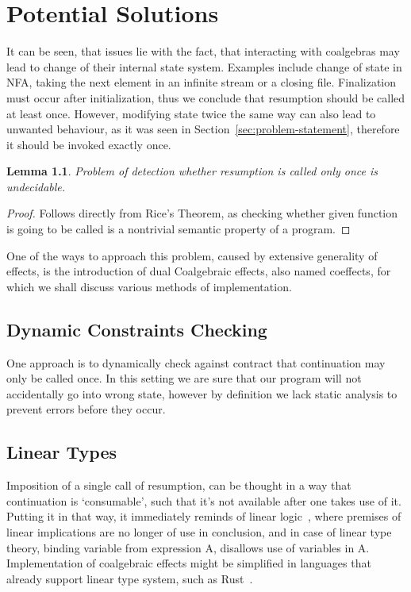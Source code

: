 \documentclass[declaration,shortabstract]{iithesis}
\theoremstyle{definition} \newtheorem{definition}{Definition}[chapter]
\theoremstyle{remark} \newtheorem{remark}[definition]{Observation}
\theoremstyle{plain} \newtheorem{theorem}[definition]{Theorem}
\theoremstyle{plain} \newtheorem{lemma}[definition]{Lemma}
\begin{document}
\chapter{Potential Solutions}\label{chapter:potential-solutions}

It can be seen, that issues lie with the fact, that interacting with coalgebras
may lead to change of their internal state system. Examples include change of
state in NFA, taking the next element in an infinite stream or a closing file.
Finalization must occur after initialization, thus we conclude that resumption
should be called at least once. However, modifying state twice the same way can
also lead to unwanted behaviour, as it was seen in
Section~\ref{sec:problem-statement}, therefore it should be invoked exactly
once.

\begin{lemma}
    Problem of detection whether resumption is called only once is undecidable.
\end{lemma}
\begin{proof}
    Follows directly from Rice's Theorem, as checking whether given function is
    going to be called is a nontrivial semantic property of a program.
\end{proof}

One of the ways to approach this problem, caused by extensive generality of
effects, is the introduction of dual Coalgebraic effects, also named coeffects,
for which we shall discuss various methods of implementation.

\section{Dynamic Constraints Checking}

One approach is to dynamically check against contract that continuation may only
be called once. In this setting we are sure that our program will not accidentally
go into wrong state, however by definition we lack static analysis to prevent
errors before they occur.

\section{Linear Types}

Imposition of a single call of resumption, can be thought in a way that continuation
is `consumable', such that it's not available after one takes use of it. Putting
it in that way, it immediately reminds of linear logic~\cite{linear-logic},
where premises of linear implications are no longer of use in conclusion, and
in case of linear type theory, binding variable from expression A, disallows
use of variables in A. Implementation of coalgebraic effects might be simplified
in languages that already support linear type system, such as Rust~\cite{rust}.
\end{document}

